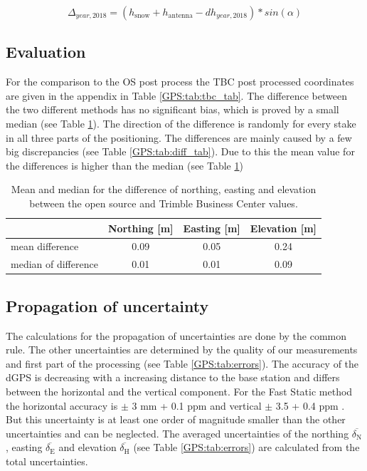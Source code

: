\begin{equation}
	\Delta_{year,2018} = (h_{\text{snow}} + h_{\text{antenna}} - dh_{year,2018}) * sin(\alpha)
\end{equation}

\subsection{Evaluation}
For the comparison to the OS post process the TBC post processed coordinates are given in the appendix in Table \ref{GPS:tab:tbc_tab}.
The difference between the two different methods has no significant bias, which is proved by a small median (see Table \ref{GPS:tab:diff}).
The direction of the difference is randomly for every stake in all three parts of the positioning.
The differences are mainly caused by a few big discrepancies (see Table \ref{GPS:tab:diff_tab}).
Due to this the mean value for the differences is higher than the median (see Table \ref{GPS:tab:diff}) 

\begin{table}[H]
	\caption{Mean and median for the difference of northing, easting and elevation between the open source and Trimble Business Center values.}
	\centering
	\begin{tabular}{lccc}
	\toprule         
      &  Northing [m] & Easting [m] & Elevation [m] \\
	\midrule
    mean difference &  0.09 & 0.05 & 0.24 \\
    median of difference & 0.01 & 0.01 & 0.09 \\
    \bottomrule
	\end{tabular}
	\label{GPS:tab:diff}
\end{table}

\subsection{Propagation of uncertainty}

The calculations for the propagation of uncertainties are done by the common rule.
The other uncertainties are determined by the quality of our measurements and first part of the processing (see Table \ref{GPS:tab:errors}).
The accuracy of the dGPS is decreasing with a increasing distance to the base station and differs between the horizontal and the vertical component.
For the Fast Static method the horizontal accuracy is $ \pm $ 3 mm + 0.1 ppm and vertical $ \pm $ 3.5 + 0.4 ppm  \citep{Trquickstart}.
But this uncertainty is at least one order of magnitude smaller than the other uncertainties and can be neglected. 
The averaged uncertainties of the northing $ \overline{\delta_{\text{N}}} $, easting $ \overline{\delta_{\text{E}}} $ and elevation $ \overline{\delta_{\text{H}}} $ (see Table \ref{GPS:tab:errors}) are calculated from the total uncertainties.

